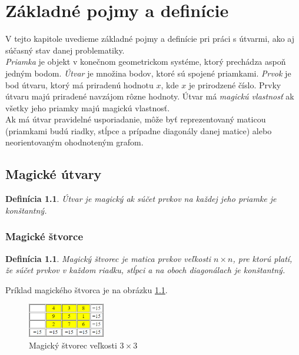 \chapter{Základné pojmy a definície}

\label{kap:definitions} %
\newtheorem{definition}{Definícia}[section]
\newtheorem{theorem}{Veta}[section]
\newtheorem{note}{Poznámka}[section]
\newtheorem{subdefinition}{Definícia}[subsection]
\newtheorem{subtheorem}{Veta}[subsection]
\newtheorem{subnote}{Poznámka}[subsection]

V tejto kapitole uvedieme základné pojmy a definície pri práci s útvarmi, ako aj súčasný stav danej problematiky. \\

\textit{Priamka} je objekt v konečnom geometrickom systéme, ktorý prechádza aspoň jedným bodom. \textit{Útvar} je množina bodov, ktoré sú spojené priamkami. \textit{Prvok} je bod útvaru, ktorý má priradenú hodnotu $x$, kde $x$ je prirodzené číslo. Prvky útvaru majú priradené navzájom rôzne hodnoty. Útvar má \textit{magickú vlastnosť} ak všetky jeho priamky majú magickú vlastnosť. \\

Ak má útvar pravidelné usporiadanie, môže byť reprezentovaný maticou (priamkami budú riadky, stĺpce a prípadne diagonály danej matice) alebo neorientovaným ohodnoteným grafom.

\section{Magické útvary}
\begin{definition} Útvar je magický ak súčet prvkov na každej jeho priamke je konštantný.
\end{definition}

\subsection{Magické štvorce}
\begin{subdefinition} Magický štvorec je matica prvkov veľkosti $n \times n$, pre ktorú platí, že súčet prvkov v každom riadku, stĺpci a na oboch diagonálach je konštantný.
\end{subdefinition}

Príklad magického štvorca je na obrázku \ref{obr:fig_basic_magic_3x3}.

\begin{figure}[H]
\centerline{\includegraphics[width=0.3\textwidth]{images/basic_magic_3x3}}
\caption[Magický štvorec veľkosti $3 \times 3$]{Magický štvorec veľkosti $3 \times 3$ \cite{multimagie}}
\label{obr:fig_basic_magic_3x3}
\end{figure}

